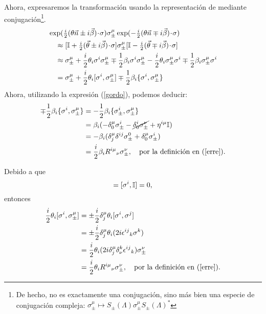 \par Ahora, expresaremos la transformación usando la representación de \gldc mediante conjugación\footnote{De hecho, no es exactamente una conjugación, sino más bien una especie de conjugación compleja: $\sigma_\pm^\mu\mapsto S_\pm(\Lambda)\sigma_\pm^\mu S_\pm(\Lambda)^*$}.
\begin{equation}\begin{split}
&\exp(\tfrac i2(\theta \vec n\pm i\vec\beta)\jdot\sigma)
\sigma_\pm^\mu
\exp(-\tfrac i2(\theta \vec n\mp i\vec\beta)\jdot\sigma)\\
&\quad\approx
[\id+\tfrac i2(\vec \theta\pm i\vec\beta)\jdot\sigma]
\sigma_\pm^\mu
[\id-\tfrac i2(\vec \theta\mp i\vec\beta)\jdot\sigma]\\
&\quad\approx
\sigma_\pm^\mu
+\frac i2\theta_i\sigma^i\sigma_\pm^\mu
\mp\frac12\beta_i\sigma^i\sigma_\pm^\mu
-\frac i2\theta_i\sigma_\pm^\mu\sigma^i
\mp\frac12\beta_i\sigma_\pm^\mu\sigma^i\\
&\quad=
\sigma_\pm^\mu
+\frac i2\theta_i[\sigma^i,\sigma_\pm^\mu]
\mp\frac12\beta_i\{\sigma^i,\sigma_\pm^\mu\}
\end{split}\label{tren}\end{equation}
Ahora, utilizando la expresión (\ref{gordo}), podemos deducir:
\begin{equation}\begin{split}
\mp\frac12\beta_i\{\sigma^i,\sigma_\pm^\mu\}
&=-\frac12\beta_i\{\sigma_\pm^i,\sigma_\pm^\mu\}\\
&=\beta_i(-\delta_0^\mu\sigma_\pm^i-\cancel{\delta_0^i\sigma_\pm^\nu}+\eta^{i\mu}\mathbb I)\\
&=-\beta_i(\delta^\mu_j\delta^{ij}\sigma_\pm^0+\delta^\mu_0\sigma_\pm^i)\\
&=\frac i2\beta_iR^{i\mu}{}_\nu\sigma_\pm^\nu,
\quad\text{por la definición en (\ref{erre}).}
\end{split}\end{equation}
\par Debido a que
\begin{equation}
[\sigma^i,\sigma_\pm^0]
=[\sigma^i,\id]=0,
\end{equation}
entonces
\begin{equation}\begin{split}
 \frac i2\theta_i[\sigma^i,\sigma_\pm^\mu]
&=\pm\frac i2\delta_j^\mu\theta_i[\sigma^i,\sigma^j]\\
&=\pm\frac i2\delta_j^\mu\theta_i(2i\epsilon^{ij}{}_k\sigma^k)\\
&=\frac i2\theta_i(2i\delta^\mu_j\delta^k_\nu\epsilon^{ij}{}_k)\sigma_\pm^\nu\\
&=\frac i2\theta_iR^{i\mu}{}_\nu\sigma_\pm^\nu,
\quad\text{por la definición en (\ref{erre}).}
\end{split}\end{equation}

